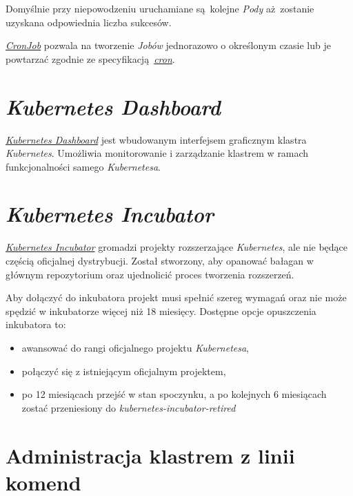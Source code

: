 \documentclass[a4paper,12pt,twoside,openany]{report}
\providecommand{\tightlist}{%
  \setlength{\itemsep}{0pt}\setlength{\parskip}{0pt}}
\begin{document}
Domyślnie przy niepowodzeniu uruchamiane są~kolejne \emph{Pody}
aż~zostanie uzyskana odpowiednia liczba sukcesów.

\href{https://kubernetes.io/docs/concepts/workloads/controllers/cron-jobs/}{\emph{CronJob}}
pozwala na tworzenie \emph{Jobów} jednorazowo o określonym czasie lub je
powtarzać zgodnie ze
specyfikacją~\href{https://en.wikipedia.org/wiki/Cron}{\emph{cron}}.

\hypertarget{kubernetes-dashboard}{%
\section{\texorpdfstring{\emph{Kubernetes
Dashboard}}{Kubernetes Dashboard}}\label{kubernetes-dashboard}}

\href{https://github.com/kubernetes/dashboard}{\emph{Kubernetes
Dashboard}} jest wbudowanym interfejsem graficznym klastra
\emph{Kubernetes}. Umożliwia monitorowanie i zarządzanie klastrem w
ramach funkcjonalności samego \emph{Kubernetesa}.

\hypertarget{kubernetes-incubator}{%
\section{\texorpdfstring{\emph{Kubernetes
Incubator}}{Kubernetes Incubator}}\label{kubernetes-incubator}}

\href{https://github.com/kubernetes/community/blob/master/incubator.md}{\emph{Kubernetes
Incubator}} gromadzi projekty rozszerzające \emph{Kubernetes}, ale nie
będące częścią oficjalnej dystrybucji. Został stworzony, aby opanować
bałagan w głównym repozytorium oraz ujednolicić proces tworzenia
rozszerzeń.

Aby dołączyć do inkubatora projekt musi spełnić szereg wymagań oraz nie
może spędzić w inkubatorze więcej niż 18 miesięcy. Dostępne opcje
opuszczenia inkubatora to:

\begin{itemize}
\tightlist
\item
  awansować do rangi oficjalnego projektu \emph{Kubernetesa},
\item
  połączyć się z istniejącym oficjalnym projektem,
\item
  po 12 miesiącach przejść w stan spoczynku, a po kolejnych 6 miesiącach
  zostać przeniesiony do \emph{kubernetes-incubator-retired}
\end{itemize}

\hypertarget{administracja-klastrem-z-linii-komend}{%
\section{Administracja klastrem z linii
komend}\label{administracja-klastrem-z-linii-komend}}
\end{document}
